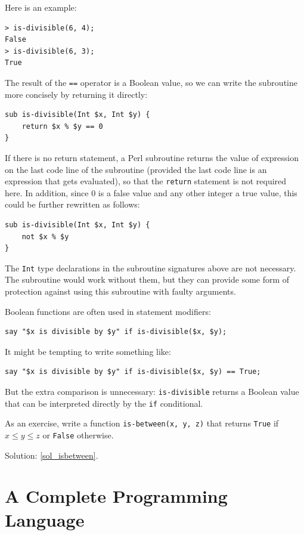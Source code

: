 Here is an example:

\begin{verbatim}
> is-divisible(6, 4);
False
> is-divisible(6, 3);
True
\end{verbatim}
%
The result of the {\tt ==} operator is a Boolean value, so we 
can write the subroutine more concisely by returning it directly:

\begin{verbatim}
sub is-divisible(Int $x, Int $y) {
    return $x % $y == 0
}
\end{verbatim}
%
If there is no return statement, a Perl subroutine returns the 
value of expression on the last code line of the subroutine 
(provided the last code line is an expression that gets evaluated), so that the 
{\tt return} statement is not required here. In addition, 
since 0 is a false value and any other integer a true value, 
this could be further rewritten as follows:
\begin{verbatim}
sub is-divisible(Int $x, Int $y) { 
    not $x % $y 
}
\end{verbatim}

The {\tt Int} type declarations in the subroutine signatures above 
are not necessary. The subroutine would work without them, but 
they can provide some form of protection against using this 
subroutine with faulty arguments.

Boolean functions are often used in statement modifiers:

\begin{verbatim}
say "$x is divisible by $y" if is-divisible($x, $y);
\end{verbatim}
%
It might be tempting to write something like:

\begin{verbatim}
say "$x is divisible by $y" if is-divisible($x, $y) == True;
\end{verbatim}
%
But the extra comparison is unnecessary: {\tt is-divisible} 
returns a Boolean value that can be interpreted directly by
the {\tt if} conditional.

\label{isbetween}
As an exercise, write a function \verb"is-between(x, y, z)" that
returns {\tt True} if $x \le y \le z$ or {\tt False} otherwise.

Solution: \ref{sol_isbetween}.

\section{A Complete Programming Language}

